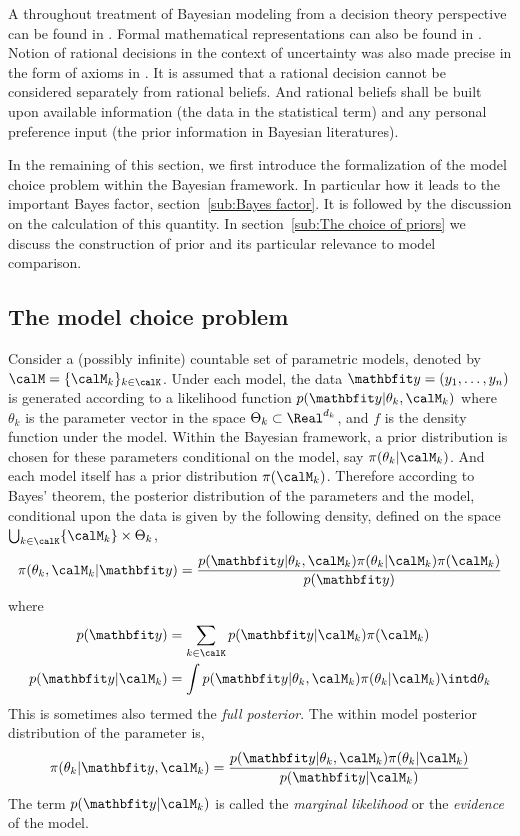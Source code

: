 A throughout treatment of Bayesian modeling from a decision theory perspective
can be found in \cite{Robert:2007tc}. Formal mathematical representations can
also be found in \cite[][sec.~5.1 and sec.~6.1]{Bernardo:1994vd}. Notion of
rational decisions in the context of uncertainty was also made precise in the
form of axioms in \cite{DeFinetti:1974tg,DeFinetti:1975ua}. It is assumed that
a rational decision cannot be considered separately from rational beliefs. And
rational beliefs shall be built upon available information (the data in the
statistical term) and any personal preference input (the prior information in
Bayesian literatures).

In the remaining of this section, we first introduce the formalization of the
model choice problem within the Bayesian framework. In particular how it leads
to the important Bayes factor, section~\ref{sub:Bayes factor}. It is followed
by the discussion on the calculation of this quantity. In section~\ref{sub:The
  choice of priors} we discuss the construction of prior and its particular
relevance to model comparison.

\subsection{The model choice problem}
\label{sub:The model choice problem}

Consider a (possibly infinite) countable set of parametric models, denoted by
$\calM = \{\calM_k\}_{k\in\calK}$. Under each model, the data $\data =
(y_1,\dots,y_n)$ is generated according to a likelihood function
$p(\data|\theta_k,\calM_k)$ where $\theta_k$ is the parameter vector in the
space $\Theta_k\subset\Real^{d_k}$, and $f$ is the density function under the
model. Within the Bayesian framework, a prior distribution is chosen for these
parameters conditional on the model, say $\pi(\theta_k|\calM_k)$. And each
model itself has a prior distribution $\pi(\calM_k)$. Therefore according to
Bayes' theorem, the posterior distribution of the parameters and the model,
conditional upon the data is given by the following density, defined on the
space $\bigcup_{k\in\calK}\{\calM_k\}\times\Theta_k$,
\begin{equation}
  \pi(\theta_k,\calM_k|\data) =
  \frac{p(\data|\theta_k,\calM_k)\pi(\theta_k|\calM_k)\pi(\calM_k)}{p(\data)}
  \label{eq:full posterior}
\end{equation}
where
\begin{align}
  p(\data) &= \sum_{k\in\calK}p(\data|\calM_k)\pi(\calM_k) \\
  p(\data|\calM_k) &=
  \int p(\data|\theta_k,\calM_k)\pi(\theta_k|\calM_k)\intd\theta_k
  \label{eq:marginal likelihood}
\end{align}
This is sometimes also termed the \emph{full posterior}. The within model
posterior distribution of the parameter is,
\begin{equation}
  \pi(\theta_k|\data,\calM_k) =
  \frac{p(\data|\theta_k,\calM_k)\pi(\theta_k|\calM_k)}{p(\data|\calM_k)}
  \label{eq:within posterior}
\end{equation}
The term $p(\data|\calM_k)$ is called the \emph{marginal likelihood} or the
\emph{evidence} of the model.

